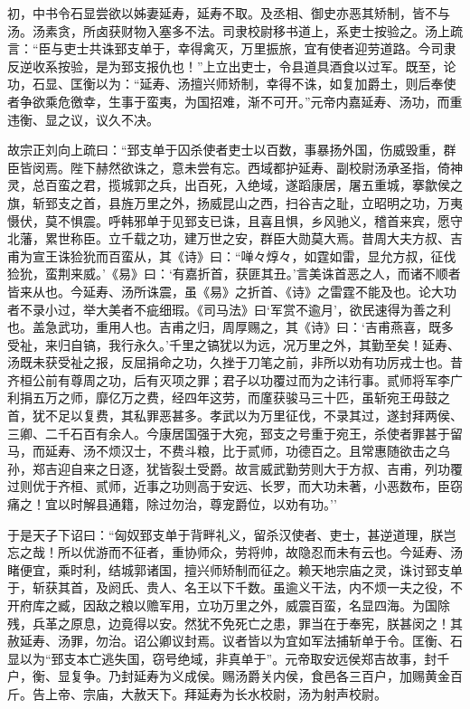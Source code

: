 \documentclass[]{article}
\begin{document}
初，中书令石显尝欲以姊妻延寿，延寿不取。及丞相、御史亦恶其矫制，皆不与汤。汤素贪，所卤获财物入塞多不法。司隶校尉移书道上，系吏士按验之。汤上疏言：``臣与吏士共诛郅支单于，幸得禽灭，万里振旅，宜有使者迎劳道路。今司隶反逆收系按验，是为郅支报仇也！''上立出吏士，令县道具酒食以过军。既至，论功，石显、匡衡以为：``延寿、汤擅兴师矫制，幸得不诛，如复加爵土，则后奉使者争欲乘危徼幸，生事于蛮夷，为国招难，渐不可开。''元帝内嘉延寿、汤功，而重违衡、显之议，议久不决。

故宗正刘向上疏曰：``郅支单于囚杀使者吏士以百数，事暴扬外国，伤威毁重，群臣皆闵焉。陛下赫然欲诛之，意未尝有忘。西域都护延寿、副校尉汤承圣指，倚神灵，总百蛮之君，揽城郭之兵，出百死，入绝域，遂蹈康居，屠五重城，搴歙侯之旗，斩郅支之首，县旌万里之外，扬威昆山之西，扫谷吉之耻，立昭明之功，万夷慑伏，莫不惧震。呼韩邪单于见郅支已诛，且喜且惧，乡风驰义，稽首来宾，愿守北藩，累世称臣。立千载之功，建万世之安，群臣大勋莫大焉。昔周大夫方叔、吉甫为宣王诛猃狁而百蛮从，其《诗》曰：``啴々焞々，如霆如雷，显允方叔，征伐猃狁，蛮荆来威。'《易》曰：`有嘉折首，获匪其丑。'言美诛首恶之人，而诸不顺者皆来从也。今延寿、汤所诛震，虽《易》之折首、《诗》之雷霆不能及也。论大功者不录小过，举大美者不疵细瑕。《司马法》曰`军赏不逾月'，欲民速得为善之利也。盖急武功，重用人也。吉甫之归，周厚赐之，其《诗》曰：`吉甫燕喜，既多受祉，来归自镐，我行永久。'千里之镐犹以为远，况万里之外，其勤至矣！延寿、汤既未获受祉之报，反屈捐命之功，久挫于刀笔之前，非所以劝有功厉戎士也。昔齐桓公前有尊周之功，后有灭项之罪；君子以功覆过而为之讳行事。贰师将军李广利捐五万之师，靡亿万之费，经四年这劳，而廑获骏马三十匹，虽斩宛王毋鼓之首，犹不足以复费，其私罪恶甚多。孝武以为万里征伐，不录其过，遂封拜两侯、三卿、二千石百有余人。今康居国强于大宛，郅支之号重于宛王，杀使者罪甚于留马，而延寿、汤不烦汉士，不费斗粮，比于贰师，功德百之。且常惠随欲击之乌孙，郑吉迎自来之日逐，犹皆裂土受爵。故言威武勤劳则大于方叔、吉甫，列功覆过则优于齐桓、贰师，近事之功则高于安远、长罗，而大功未著，小恶数布，臣窃痛之！宜以时解县通籍，除过勿治，尊宠爵位，以劝有功。''

于是天子下诏曰：``匈奴郅支单于背畔礼义，留杀汉使者、吏士，甚逆道理，朕岂忘之哉！所以优游而不征者，重协师众，劳将帅，故隐忍而未有云也。今延寿、汤睹便宜，乘时利，结城郭诸国，擅兴师矫制而征之。赖天地宗庙之灵，诛讨郅支单于，斩获其首，及阏氏、贵人、名王以下千数。虽逾义干法，内不烦一夫之役，不开府库之臧，因敌之粮以赡军用，立功万里之外，威震百蛮，名显四海。为国除残，兵革之原息，边竟得以安。然犹不免死亡之患，罪当在于奉宪，朕甚闵之！其赦延寿、汤罪，勿治。诏公卿议封焉。议者皆以为宜如军法捕斩单于令。匡衡、石显以为``郅支本亡逃失国，窃号绝域，非真单于''。元帝取安远侯郑吉故事，封千户，衡、显复争。乃封延寿为义成侯。赐汤爵关内侯，食邑各三百户，加赐黄金百斤。告上帝、宗庙，大赦天下。拜延寿为长水校尉，汤为射声校尉。
\end{document}
